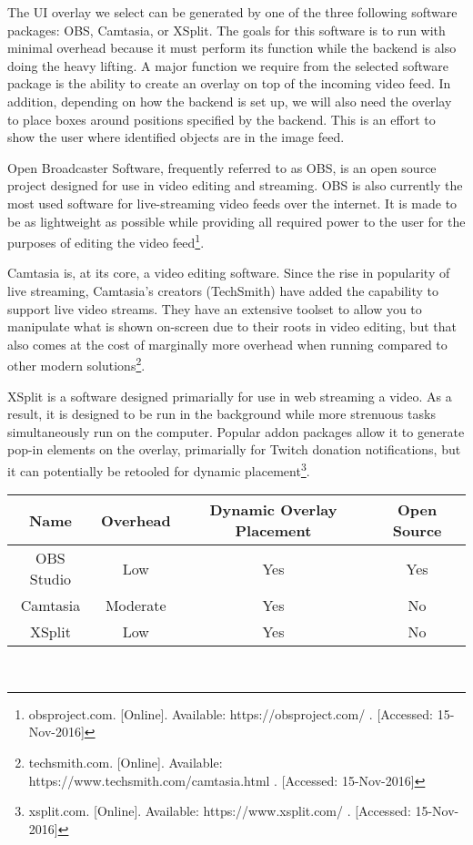 \documentclass[letterpaper,10pt,onecolumn,draftclsnofoot]{IEEEtran}
\begin{document}
The UI overlay we select can be generated by one of the three following software packages:  OBS, Camtasia, or XSplit.  The goals for this software is to run with minimal overhead because it must perform its function while the backend is also doing the heavy lifting.  A major function we require from the selected software package is the ability to create an overlay on top of the incoming video feed.  In addition, depending on how the backend is set up, we will also need the overlay to place boxes around positions specified by the backend.  This is an effort to show the user where identified objects are in the image feed.

Open Broadcaster Software, frequently referred to as OBS, is an open source project designed for use in video editing and streaming.  OBS is also currently the most used software for live-streaming video feeds over the internet.  It is made to be as lightweight as possible while providing all required power to the user for the purposes of editing the video feed\footnote{obsproject.com. [Online]. Available: https://obsproject.com/ . [Accessed: 15-Nov-2016] }.

Camtasia is, at its core, a video editing software.  Since the rise in popularity of live streaming, Camtasia's creators (TechSmith) have added the capability to support live video streams.  They have an extensive toolset to allow you to manipulate what is shown on-screen due to their roots in video editing, but that also comes at the cost of marginally more overhead when running compared to other modern solutions\footnote{techsmith.com. [Online]. Available: https://www.techsmith.com/camtasia.html . [Accessed: 15-Nov-2016] }.

XSplit is a software designed primarially for use in web streaming a video.  As a result, it is designed to be run in the background while more strenuous tasks simultaneously run on the computer.  Popular addon packages allow it to generate pop-in elements on the overlay, primarially for Twitch donation notifications, but it can potentially be retooled for dynamic placement\footnote{xsplit.com. [Online]. Available: https://www.xsplit.com/ . [Accessed: 15-Nov-2016] }. \\

\begin{tabular}{|c|c|c|c|}
  \hline
  \textbf{Name} & \textbf{Overhead} & \textbf{Dynamic Overlay Placement} & \textbf{Open Source} \\
  \hline
  OBS Studio & Low & Yes & Yes \\ 
  \hline
  Camtasia & Moderate & Yes & No  \\ 
  \hline
  XSplit & Low & Yes & No \\ 
  \hline
\end{tabular} \\
\end{document}
